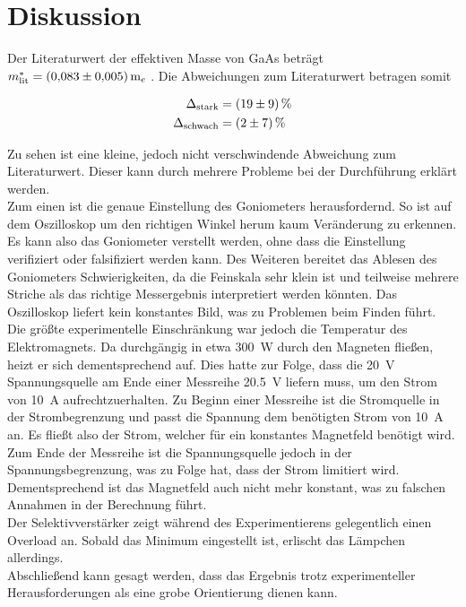 %

%
\section{Diskussion}
\label{sec:Diskussion}

%
Der Literaturwert der effektiven Masse von GaAs beträgt $m^*_\text{lit}=\qty{0.083\pm0.005}m_e$ \cite{v46_paper}.
%
%
Die Abweichungen zum Literaturwert betragen somit


%
\begin{align*}
    \Delta_\text{stark} &= \qty{19\pm9}{\percent}\\
    \Delta_\text{schwach} &= \qty{2\pm7}{\percent}\\
\end{align*}

\noindent Zu sehen ist eine kleine, jedoch nicht verschwindende Abweichung zum Literaturwert. Dieser kann durch mehrere Probleme bei der Durchführung erklärt werden.\\
\noindent Zum einen ist die genaue Einstellung des Goniometers herausfordernd. So ist auf dem Oszilloskop um den richtigen Winkel herum kaum Veränderung zu 
erkennen. Es kann also das Goniometer verstellt werden, ohne dass die Einstellung verifiziert oder falsifiziert werden kann. Des Weiteren bereitet das 
Ablesen des Goniometers Schwierigkeiten, da die Feinskala sehr klein ist und teilweise mehrere Striche als das richtige Messergebnis interpretiert werden 
könnten. Das Oszilloskop liefert kein konstantes Bild, was zu Problemen beim Finden führt. \\
Die größte experimentelle Einschränkung war jedoch die Temperatur des Elektromagnets. Da durchgängig in etwa \qty{300}{\watt} durch den Magneten fließen, 
heizt er sich dementsprechend auf. Dies hatte zur Folge, dass die \qty{20}{\volt} Spannungsquelle am Ende einer Messreihe \qty{20.5}{\volt} 
liefern muss, um den Strom von \qty{10}{\ampere} aufrechtzuerhalten. Zu Beginn einer Messreihe ist die Stromquelle in der Strombegrenzung und passt die 
Spannung dem benötigten Strom von \qty{10}{\ampere} an. Es fließt also der Strom, welcher für ein konstantes Magnetfeld benötigt wird. Zum Ende der 
Messreihe ist die Spannungsquelle jedoch in der Spannungsbegrenzung, was zu Folge hat, dass der Strom limitiert wird. Dementsprechend ist das 
Magnetfeld auch nicht mehr konstant, was zu falschen Annahmen in der Berechnung führt.\\
Der Selektivverstärker zeigt während des Experimentierens gelegentlich einen Overload an. Sobald das Minimum eingestellt ist, erlischt das 
Lämpchen allerdings.\\
Abschließend kann gesagt werden, dass das Ergebnis trotz experimenteller Herausforderungen als eine grobe Orientierung dienen kann.
%
